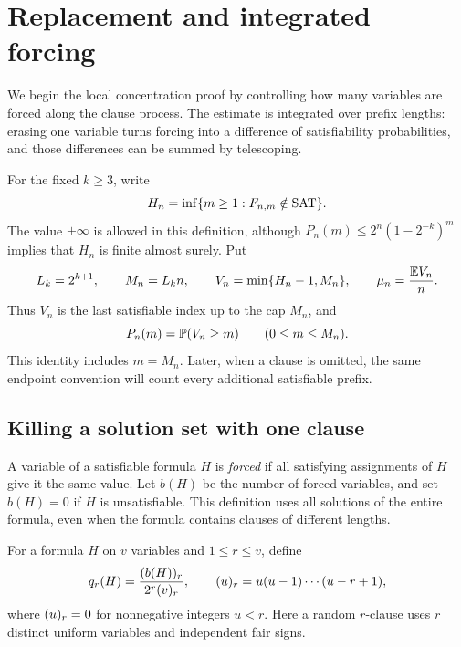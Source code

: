 \section{Replacement and integrated forcing}\label{sec:forcing}

We begin the local concentration proof by controlling how many
variables are forced along the clause process. The estimate is
integrated over prefix lengths: erasing one variable turns forcing into
a difference of satisfiability probabilities, and those differences
can be summed by telescoping.

\begin{samepage}
For the fixed \(k\ge3\), write
\[
 H_n=\inf\{m\ge1:F_{n,m}\notin\mathrm{SAT}\}.
\]
The value \(+\infty\) is allowed in this definition, although
\(P_n(m)\le2^n(1-2^{-k})^m\) implies that \(H_n\) is finite almost
surely. Put
\begin{equation}\label{eq:statistic}
 L_k=2^{k+1},\qquad M_n=L_kn,\qquad
 V_n=\min\{H_n-1,M_n\},\qquad \mu_n=\frac{\mathbb E V_n}{n}.
\end{equation}
Thus \(V_n\) is the last satisfiable index up to the cap \(M_n\), and
\begin{equation}\label{eq:survival}
 P_n(m)=\mathbb P(V_n\ge m)\qquad(0\le m\le M_n).
\end{equation}
This identity includes \(m=M_n\). Later, when a clause is omitted, the
same endpoint convention will count every additional satisfiable prefix.
\end{samepage}

\subsection{Killing a solution set with one clause}

A variable of a satisfiable formula \(H\) is \emph{forced} if all
satisfying assignments of \(H\) give it the same value. Let \(b(H)\) be
the number of forced variables, and set \(b(H)=0\) if \(H\) is
unsatisfiable. This definition uses all solutions of the entire
formula, even when the formula contains clauses of different lengths.

For a formula \(H\) on \(v\) variables and \(1\le r\le v\), define
\begin{equation}\label{eq:kill}
 q_r(H)=\frac{(b(H))_{r}}{2^r(v)_{r}},
 \qquad
 (u)_{r}=u(u-1)\cdots(u-r+1),
\end{equation}
where \((u)_{r}=0\) for nonnegative integers \(u<r\).
Here a random \(r\)-clause uses \(r\) distinct uniform variables and
independent fair signs.

